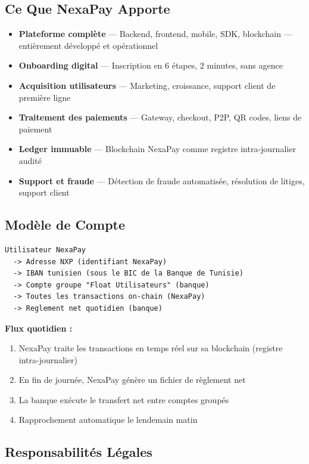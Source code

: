 \documentclass[11pt,a4paper]{article}
\begin{document}
\subsection{Ce Que NexaPay Apporte}

\begin{itemize}[leftmargin=*]
    \item \textbf{Plateforme compl\`ete} --- Backend, frontend, mobile, SDK, blockchain --- enti\`erement d\'evelopp\'e et op\'erationnel
    \item \textbf{Onboarding digital} --- Inscription en 6 \'etapes, 2 minutes, sans agence
    \item \textbf{Acquisition utilisateurs} --- Marketing, croissance, support client de premi\`ere ligne
    \item \textbf{Traitement des paiements} --- Gateway, checkout, P2P, QR codes, liens de paiement
    \item \textbf{Ledger immuable} --- Blockchain NexaPay comme registre intra-journalier audit\'e
    \item \textbf{Support et fraude} --- D\'etection de fraude automatis\'ee, r\'esolution de litiges, support client
\end{itemize}

\subsection{Mod\`ele de Compte}

\begin{verbatim}
Utilisateur NexaPay
  -> Adresse NXP (identifiant NexaPay)
  -> IBAN tunisien (sous le BIC de la Banque de Tunisie)
  -> Compte groupe "Float Utilisateurs" (banque)
  -> Toutes les transactions on-chain (NexaPay)
  -> Reglement net quotidien (banque)
\end{verbatim}

\textbf{Flux quotidien :}
\begin{enumerate}[leftmargin=*]
    \item NexaPay traite les transactions en temps r\'eel sur sa blockchain (registre intra-journalier)
    \item En fin de journ\'ee, NexaPay g\'en\`ere un fichier de r\`eglement net
    \item La banque ex\'ecute le transfert net entre comptes group\'es
    \item Rapprochement automatique le lendemain matin
\end{enumerate}

\subsection{Responsabilit\'es L\'egales}
\end{document}
